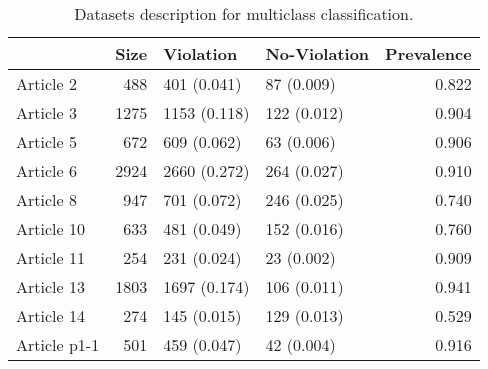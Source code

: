 \begin{table}
\centering
\caption{Datasets description for multiclass classification.}
\label{table:multiclass_datasets}
\begin{tabular}{lrllr}
\toprule
             &  Size &    Violation & No-Violation &  Prevalence \\
\midrule
   Article 2 &   488 &  401 (0.041) &   87 (0.009) &       0.822 \\
   Article 3 &  1275 & 1153 (0.118) &  122 (0.012) &       0.904 \\
   Article 5 &   672 &  609 (0.062) &   63 (0.006) &       0.906 \\
   Article 6 &  2924 & 2660 (0.272) &  264 (0.027) &       0.910 \\
   Article 8 &   947 &  701 (0.072) &  246 (0.025) &       0.740 \\
  Article 10 &   633 &  481 (0.049) &  152 (0.016) &       0.760 \\
  Article 11 &   254 &  231 (0.024) &   23 (0.002) &       0.909 \\
  Article 13 &  1803 & 1697 (0.174) &  106 (0.011) &       0.941 \\
  Article 14 &   274 &  145 (0.015) &  129 (0.013) &       0.529 \\
Article p1-1 &   501 &  459 (0.047) &   42 (0.004) &       0.916 \\
\bottomrule
\end{tabular}
\end{table}
